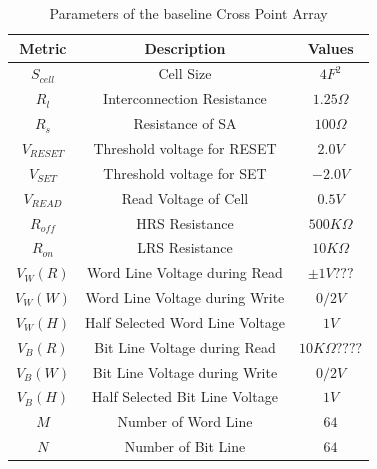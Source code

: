 \begin{table}[!b]
  \centering
  \scriptsize
    \scriptsize
  \caption{Parameters of the baseline Cross Point Array}\label{table:parameter}
  \vspace{-5pt}
  \begin{tabular}{c|c|c}
    \hline    \hline
    \textbf{Metric} & \textbf{Description} & \textbf{Values} \\
    \hline
    \textbf{$S_{cell}$} & Cell Size & \textbf{$4F^2$} \\
    \textbf{$R_l$} &  Interconnection Resistance&\textbf{$1.25\Omega$} \\
    \textbf{$R_s$} &  Resistance of SA&\textbf{$100\Omega$} \\
    \textbf{$V_{RESET}$} & Threshold voltage for RESET&\textbf{$2.0V$} \\
    \textbf{$V_{SET}$} & Threshold voltage for SET&\textbf{$-2.0V$} \\
    \textbf{$V_{READ}$} & Read Voltage of Cell&\textbf{$0.5V$} \\
    \textbf{$R_{off}$} & HRS Resistance &\textbf{$500K\Omega$} \\
    \textbf{$R_{on}$} & LRS Resistance &\textbf{$10K\Omega$} \\
    \textbf{$V_{W}(R)$} & Word Line Voltage during Read &\textbf{$\pm 1V ???$} \\
    \textbf{$V_{W}(W)$} & Word Line Voltage during Write  &\textbf{$0 / 2V$} \\
    \textbf{$V_{W}(H)$} & Half Selected Word Line Voltage &\textbf{$1V$} \\
    \textbf{$V_{B}(R)$} & Bit Line Voltage during Read  &\textbf{$10K\Omega ????$} \\
    \textbf{$V_{B}(W)$} & Bit Line Voltage during Write  &\textbf{$0 / 2V$} \\
    \textbf{$V_{B}(H)$} & Half Selected Bit Line Voltage &\textbf{$1V$} \\
    \textbf{$M$} & Number of Word Line &\textbf{$64$} \\
    \textbf{$N$} & Number of Bit Line &\textbf{$64$} \\

    \hline
  \end{tabular}
  \vspace{-10pt}
\end{table}

